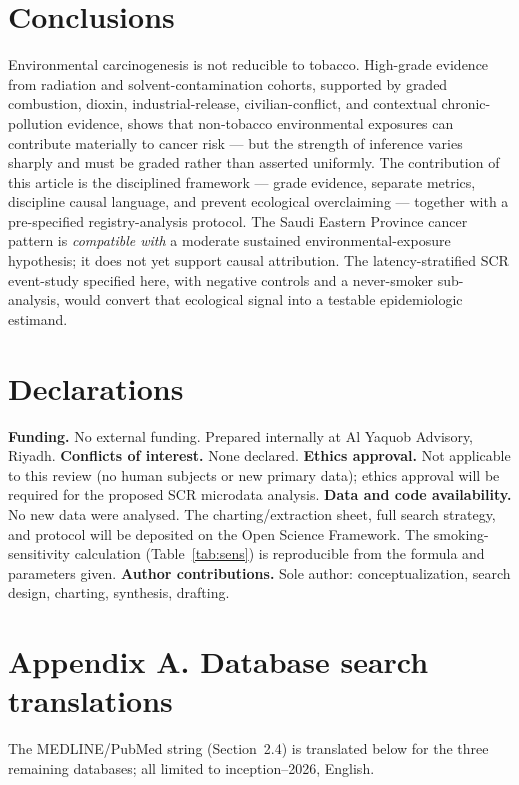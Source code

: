 \documentclass[3p,times]{elsarticle}
\begin{document}
\section{Conclusions}
Environmental carcinogenesis is not reducible to tobacco. High-grade evidence from radiation and solvent-contamination cohorts, supported by graded combustion, dioxin, industrial-release, civilian-conflict, and contextual chronic-pollution evidence, shows that non-tobacco environmental exposures can contribute materially to cancer risk --- but the strength of inference varies sharply and must be graded rather than asserted uniformly. The contribution of this article is the disciplined framework --- grade evidence, separate metrics, discipline causal language, and prevent ecological overclaiming --- together with a pre-specified registry-analysis protocol. The Saudi Eastern Province cancer pattern is \emph{compatible with} a moderate sustained environmental-exposure hypothesis; it does not yet support causal attribution. The latency-stratified SCR event-study specified here, with negative controls and a never-smoker sub-analysis, would convert that ecological signal into a testable epidemiologic estimand.

\section*{Declarations}
\textbf{Funding.} No external funding. Prepared internally at Al Yaquob Advisory, Riyadh.
\textbf{Conflicts of interest.} None declared.
\textbf{Ethics approval.} Not applicable to this review (no human subjects or new primary data); ethics approval will be required for the proposed SCR microdata analysis.
\textbf{Data and code availability.} No new data were analysed. The charting/extraction sheet, full search strategy, and protocol will be deposited on the Open Science Framework. The smoking-sensitivity calculation (Table~\ref{tab:sens}) is reproducible from the formula and parameters given.
\textbf{Author contributions.} Sole author: conceptualization, search design, charting, synthesis, drafting.

\section*{Appendix A. Database search translations}
The MEDLINE/PubMed string (Section~2.4) is translated below for the three remaining databases; all limited to inception--2026, English.
\end{document}
